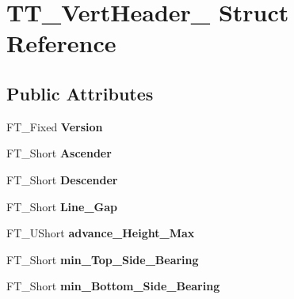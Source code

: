 \hypertarget{struct_t_t___vert_header__}{\section{T\-T\-\_\-\-Vert\-Header\-\_\- Struct Reference}
\label{struct_t_t___vert_header__}
}
\subsection*{Public Attributes}
\begin{DoxyCompactItemize}
\item 
\hypertarget{struct_t_t___vert_header___a32d736621b757e9a39a15f2f82d15b9c}{F\-T\-\_\-\-Fixed {\bfseries Version}}\label{struct_t_t___vert_header___a32d736621b757e9a39a15f2f82d15b9c}

\item 
\hypertarget{struct_t_t___vert_header___afa95848b08d1fc8bd6bfe7e639e2895c}{F\-T\-\_\-\-Short {\bfseries Ascender}}\label{struct_t_t___vert_header___afa95848b08d1fc8bd6bfe7e639e2895c}

\item 
\hypertarget{struct_t_t___vert_header___afeeb8f6c759a76d655f24f1d58f1cf35}{F\-T\-\_\-\-Short {\bfseries Descender}}\label{struct_t_t___vert_header___afeeb8f6c759a76d655f24f1d58f1cf35}

\item 
\hypertarget{struct_t_t___vert_header___a8a6ad9f251e12e6701ebe53d19a65aa5}{F\-T\-\_\-\-Short {\bfseries Line\-\_\-\-Gap}}\label{struct_t_t___vert_header___a8a6ad9f251e12e6701ebe53d19a65aa5}

\item 
\hypertarget{struct_t_t___vert_header___a7a2acbd1abd4cc4d6f40110203f99d0f}{F\-T\-\_\-\-U\-Short {\bfseries advance\-\_\-\-Height\-\_\-\-Max}}\label{struct_t_t___vert_header___a7a2acbd1abd4cc4d6f40110203f99d0f}

\item 
\hypertarget{struct_t_t___vert_header___a10d78594a56f0966ae1d7b60138fbec2}{F\-T\-\_\-\-Short {\bfseries min\-\_\-\-Top\-\_\-\-Side\-\_\-\-Bearing}}\label{struct_t_t___vert_header___a10d78594a56f0966ae1d7b60138fbec2}

\item 
\hypertarget{struct_t_t___vert_header___a21422639a4cfd8dcdc9ebb3795676292}{F\-T\-\_\-\-Short {\bfseries min\-\_\-\-Bottom\-\_\-\-Side\-\_\-\-Bearing}}\label{struct_t_t___vert_header___a21422639a4cfd8dcdc9ebb3795676292}


\end{DoxyCompactItemize}
